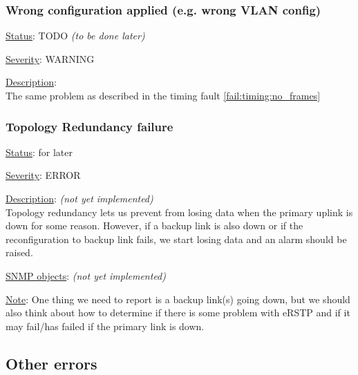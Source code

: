 \subsubsection{\bf Wrong configuration applied (e.g. wrong VLAN config)}
		\begin{pck_descr}
			\item [] \underline{Status}: TODO \emph{(to be done later)}
			\item [] \underline{Severity}: WARNING
			\item [] \underline{Description}:\\
				The same problem as described in the timing fault
				\ref{fail:timing:no_frames}
		\end{pck_descr}

\subsubsection{\bf Topology Redundancy failure}
		\begin{pck_descr}
			\item [] \underline{Status}: for later
			\item [] \underline{Severity}: ERROR
			\item [] \underline{Description}: \emph{(not yet implemented)}\\
				Topology redundancy lets us prevent from losing data when the primary
				uplink is down for some reason. However, if a backup link is also down
				or if the reconfiguration to backup link fails, we start losing data and
        an alarm should be raised.
			\item [] \underline{SNMP objects}: \emph{(not yet implemented)}
			\item [] \underline{Note}: One thing we need to report is a backup link(s)
				going down, but we should also think about how to determine if there is
				some problem with eRSTP and if it may fail/has failed if the primary
				link is down.
		\end{pck_descr}

\newpage
\subsection{Other errors}
\label{sec:other_fail}

